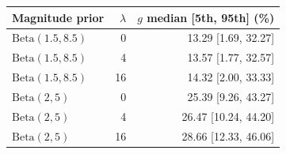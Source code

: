 \begin{tabular}{lrr}
\toprule
Magnitude prior & $\lambda$ & $g$ median [5th, 95th] (\%) \\
\midrule
$\mathrm{Beta}(1.5,8.5)$ & 0 & 13.29 [1.69, 32.27] \\
$\mathrm{Beta}(1.5,8.5)$ & 4 & 13.57 [1.77, 32.57] \\
$\mathrm{Beta}(1.5,8.5)$ & 16 & 14.32 [2.00, 33.33] \\
$\mathrm{Beta}(2,5)$ & 0 & 25.39 [9.26, 43.27] \\
$\mathrm{Beta}(2,5)$ & 4 & 26.47 [10.24, 44.20] \\
$\mathrm{Beta}(2,5)$ & 16 & 28.66 [12.33, 46.06] \\
\bottomrule
\end{tabular}
